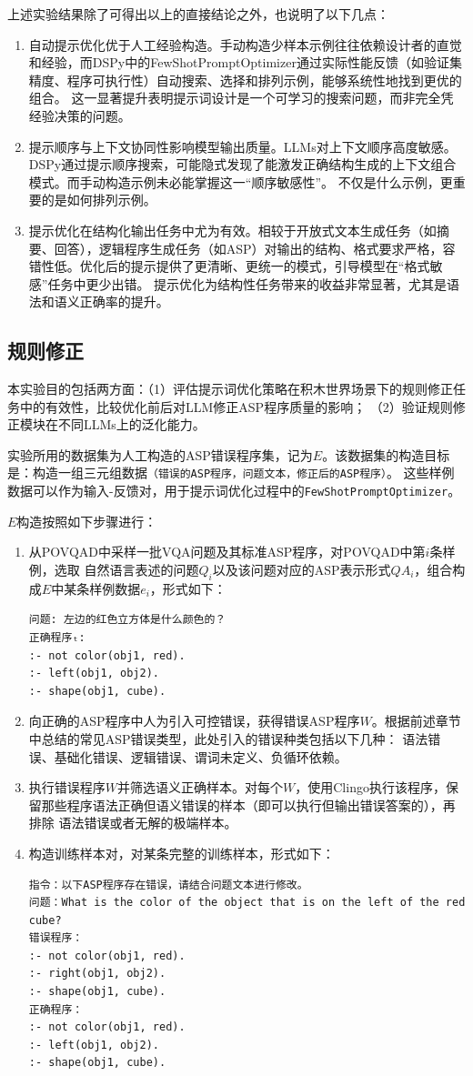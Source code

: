 上述实验结果除了可得出以上的直接结论之外，也说明了以下几点：
\begin{enumerate}[nosep]
\item 自动提示优化优于人工经验构造。手动构造少样本示例往往依赖设计者的直觉和经验，而DSPy中的FewShotPromptOptimizer通过实际性能反馈（如验证集精度、程序可执行性）自动搜索、选择和排列示例，能够系统性地找到更优的组合。
这一显著提升表明提示词设计是一个可学习的搜索问题，而非完全凭经验决策的问题。
\item 提示顺序与上下文协同性影响模型输出质量。LLMs对上下文顺序高度敏感。DSPy通过提示顺序搜索，可能隐式发现了能激发正确结构生成的上下文组合模式。而手动构造示例未必能掌握这一“顺序敏感性”。
不仅是什么示例，更重要的是如何排列示例。
\item 提示优化在结构化输出任务中尤为有效。相较于开放式文本生成任务（如摘要、回答），逻辑程序生成任务（如ASP）对输出的结构、格式要求严格，容错性低。优化后的提示提供了更清晰、更统一的模式，引导模型在“格式敏感”任务中更少出错。
提示优化为结构性任务带来的收益非常显著，尤其是语法和语义正确率的提升。
\end{enumerate}
\subsection{规则修正}
本实验目的包括两方面：（1）评估提示词优化策略在积木世界场景下的规则修正任务中的有效性，比较优化前后对LLM修正ASP程序质量的影响；
（2）验证规则修正模块在不同LLMs上的泛化能力。

实验所用的数据集为人工构造的ASP错误程序集，记为$E$。该数据集的构造目标是：构造一组三元组数据\texttt{（错误的ASP程序，问题文本，修正后的ASP程序）}。
这些样例数据可以作为输入-反馈对，用于提示词优化过程中的\texttt{FewShotPromptOptimizer}。

$E$构造按照如下步骤进行：
\begin{enumerate}[nosep]
\item 从POVQAD中采样一批VQA问题及其标准ASP程序，对POVQAD中第$i$条样例，选取
自然语言表述的问题$Q_i$以及该问题对应的ASP表示形式$QA_i$，组合构成$E$中某条样例数据$e_i$，形式如下：
\begin{lstlisting}
问题: 左边的红色立方体是什么颜色的？
正确程序ₜ:
:- not color(obj1, red).
:- left(obj1, obj2).
:- shape(obj1, cube).
\end{lstlisting}
\item 向正确的ASP程序中人为引入可控错误，获得错误ASP程序$W$。根据前述章节中总结的常见ASP错误类型，此处引入的错误种类包括以下几种：
语法错误、基础化错误、逻辑错误、谓词未定义、负循环依赖。
\item 执行错误程序$W$并筛选语义正确样本。对每个$W$，使用Clingo执行该程序，保留那些程序语法正确但语义错误的样本（即可以执行但输出错误答案的），再排除
语法错误或者无解的极端样本。
\item 构造训练样本对，对某条完整的训练样本，形式如下：
\begin{lstlisting}
指令：以下ASP程序存在错误，请结合问题文本进行修改。
问题：What is the color of the object that is on the left of the red cube?
错误程序：
:- not color(obj1, red).
:- right(obj1, obj2). 
:- shape(obj1, cube).
正确程序：
:- not color(obj1, red).
:- left(obj1, obj2).
:- shape(obj1, cube).
\end{lstlisting}
\end{enumerate}

